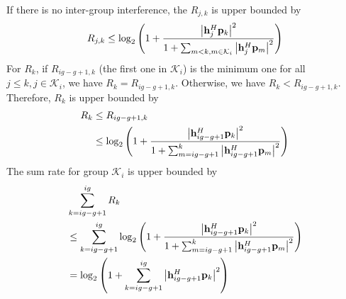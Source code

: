 \documentclass[10pt,conference]{IEEEtran}
\begin{document}
If there is no inter-group interference, the $R_{j,k}$ is upper bounded by
\begin{equation}
    R_{j,k} \leq \log_2 \left( 1 + \frac{ \left| {\bf{h}}_j^H {\bf{p}}_k \right|^2 }{1 + \sum_{m<k, m \in \mathcal{K}_i} \left| {\bf{h}}_j^H {\bf{p}}_m \right|^2} \right) \label{eq42}
\end{equation}
For $R_k$, if $R_{ig-g+1,k}$ (the first one in $\mathcal{K}_i$) is the minimum one for all $j \leq k, j \in \mathcal{K}_i$, we have
$R_k = R_{ig-g+1,k}$. Otherwise, we have $R_k < R_{ig-g+1,k}$. Therefore, $R_k$ is upper bounded by
\begin{align}
    R_k &\leq R_{ig-g+1,k} \nonumber \\
    &\leq \log_2 \left( 1 + \frac{ \left| {\bf{h}}_{ig-g+1}^H {\bf{p}}_k \right|^2 }{1 + \sum_{m=ig-g+1}^{k} \left| {\bf{h}}_{ig-g+1}^H {\bf{p}}_m \right|^2} \right)\label{eq43}
\end{align}
The sum rate for group $\mathcal{K}_i$ is upper bounded by
\begin{align}
    &\sum_{k=ig-g+1}^{ig} R_k \nonumber \\
    &\leq \sum_{k=ig-g+1}^{ig} \log_2 \left( 1 + \frac{ \left| {\bf{h}}_{ig-g+1}^H {\bf{p}}_k \right|^2 }{1 + \sum_{m=ig-g+1}^{k} \left| {\bf{h}}_{ig-g+1}^H {\bf{p}}_m \right|^2} \right) \nonumber \\
    & = \log_2 \left( 1 + \sum_{k=ig-g+1}^{ig} \left| {\bf{h}}_{ig-g+1}^H {\bf{p}}_k \right|^2 \right)
\end{align}
\end{document}
